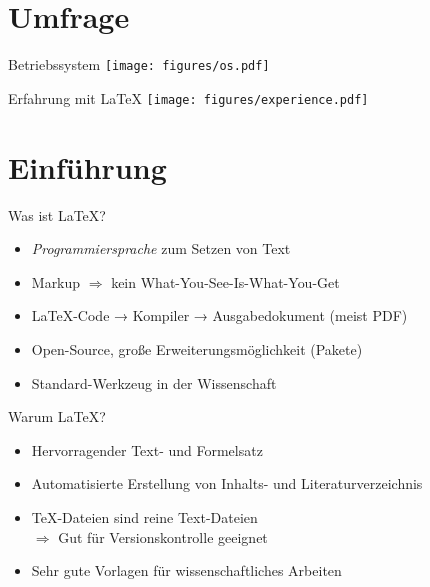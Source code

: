 \section{Umfrage}

\begin{frame}{Betriebssystem}
  \centering
  \texttt{[image: figures/os.pdf]}
\end{frame}

\begin{frame}{Erfahrung mit LaTeX}
  \centering
  \texttt{[image: figures/experience.pdf]}
\end{frame}

\section{Einführung}

\begin{frame}{Was ist \LaTeX?}
  \Large
  \linespread{1.5}
  \begin{itemize}
    \item \emph{Programmiersprache} zum Setzen von Text
    \item Markup $\Rightarrow$ kein
      \textcolor{vertexDarkRed}{W}hat-\textcolor{vertexDarkRed}{Y}ou-\textcolor{vertexDarkRed}{S}ee-\textcolor{vertexDarkRed}{I}s-\textcolor{vertexDarkRed}{W}hat-\textcolor{vertexDarkRed}{Y}ou-\textcolor{vertexDarkRed}{G}et

    \item \LaTeX-Code → Kompiler → Ausgabedokument (meist PDF)
    \item Open-Source, große Erweiterungsmöglichkeit (Pakete)
    \item Standard-Werkzeug in der Wissenschaft
  \end{itemize}
  \linespread{1.0}
\end{frame}

\begin{frame}{Warum \LaTeX?}
  \Large
  \linespread{1.5}
  \begin{itemize}
    \item Hervorragender Text- und Formelsatz
    \item Automatisierte Erstellung von Inhalts- und Literaturverzeichnis
    \item \TeX-Dateien sind reine Text-Dateien \\
      $\Rightarrow$ Gut für Versionskontrolle geeignet
    \item Sehr gute Vorlagen für wissenschaftliches Arbeiten
  \end{itemize}
  \linespread{1.0}
\end{frame}

